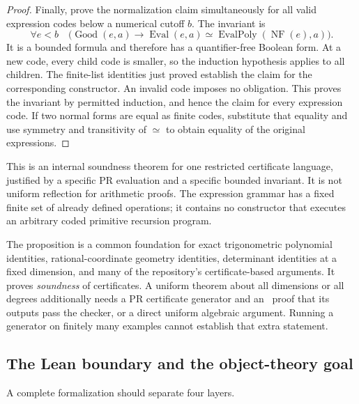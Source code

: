 \begin{proof}
Finally, prove the normalization claim simultaneously for all valid
expression codes below a numerical cutoff $b$.  The invariant is
\[
 \forall e<b\quad
 \bigl(\operatorname{Good}(e,a)\to
 \operatorname{Eval}(e,a)\simeq
 \operatorname{EvalPoly}(\operatorname{NF}(e),a)\bigr).
\]
It is a bounded formula and therefore has a quantifier-free Boolean form.
At a new code, every child code is smaller, so the induction hypothesis
applies to all children.  The finite-list identities just proved establish
the claim for the corresponding constructor.  An invalid code imposes no
obligation.  This proves the invariant by permitted induction, and hence the
claim for every expression code.  If two normal forms are equal as finite
codes, substitute that equality and use symmetry and transitivity of
$\simeq$ to obtain equality of the original expressions.
\end{proof}

This is an internal soundness theorem for one restricted certificate
language, justified by a specific PR evaluation and a specific bounded
invariant.  It is not uniform reflection for arithmetic proofs.  The
expression grammar has a fixed finite set of already defined operations;
it contains no constructor that executes an arbitrary coded primitive
recursion program.

The proposition is a common foundation for exact trigonometric polynomial
identities, rational-coordinate geometry identities, determinant identities
at a fixed dimension, and many of the repository's certificate-based
arguments.  It proves \emph{soundness} of certificates.  A uniform theorem
about all dimensions or all degrees additionally needs a PR certificate
generator and an \ipra\ proof that its outputs pass the checker, or a direct
uniform algebraic argument.  Running a generator on finitely many examples
cannot establish that extra statement.

\subsection{The Lean boundary and the object-theory goal}
\label{sec:lean-boundary}

A complete formalization should separate four layers.

